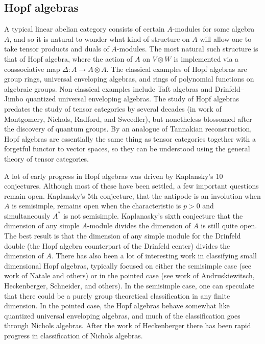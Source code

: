 \documentclass[12pt]{article}
\begin{document}
\subsection{Hopf algebras}
A typical linear abelian category consists of certain $A$-modules for some algebra $A$, and so it is natural to wonder what kind of structure on $A$ will allow one to take tensor products and duals of $A$-modules. The most natural such structure is that of Hopf algebra, where the action of $A$ on $V \otimes W$ is implemented via a coassociative map $\Delta: A \rightarrow A \otimes A$. The classical examples of Hopf algebras are group rings, universal enveloping algebras, and rings of polynomial functions on algebraic groups.  Non-classical examples include Taft algebras and Drinfeld--Jimbo quantized universal enveloping algebras.  The study of Hopf algebras predates the study of tensor categories by several decades (in work of Montgomery, Nichols, Radford, and Sweedler), but nonetheless blossomed after the discovery of quantum groups. By an analogue of Tannakian reconstruction, Hopf algebras are essentially the same thing as tensor categories together with a forgetful functor to vector spaces, so they can be understood using the general theory of tensor categories. 

A lot of early progress in Hopf algebras was driven by Kaplansky's 10 conjectures. Although most of these have been settled, a few important questions remain open. Kaplansky's 5th conjecture, that the antipode is an involution when $A$ is semisimple, remains open when the characteristic is $p>0$ and simultaneously $A^*$ is not semisimple. Kaplanasky's sixth conjecture that the dimension of any simple $A$-module divides the dimension of $A$ is still quite open. The best result is that the dimension of any simple module for the Drinfeld double (the Hopf algebra counterpart of the Drinfeld center) divides the dimension of $A$. There has also been a lot of interesting work in classifying small dimensional Hopf algebras, typically focused on either the semisimple case (see work of Natale and others) or in the pointed case (see work of Andruskiewitsch, Heckenberger, Schneider, and others). In the semisimple case, one can speculate that there could be a purely group theoretical classification in any finite dimension. In the pointed case, the Hopf algebras behave somewhat like quantized universal enveloping algebras, and much of the classification goes through Nichols algebras. After the work of Heckenberger there has been rapid progress in classification of Nichols algebras. 
\end{document}
